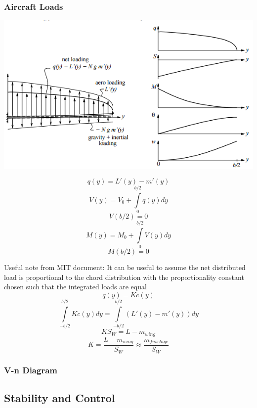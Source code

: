 \documentclass[12pt]{article}
\newcommand{\intlim}[2]{\int\limits_{#1}^{#2}}
\begin{document}
\subsubsection{Aircraft Loads}
\begin{minipage}{0.63\textwidth}
\includegraphics[width=\textwidth]{Graphics/aircraft_loads.png}
\end{minipage}
\begin{minipage}{0.35\textwidth}
$$q(y)=L'(y)-m'(y)$$
$$V(y) = V_0 + \intlim{0}{b/2}q(y)dy$$
$$V(b/2) = 0$$
$$M(y) = M_0 + \intlim{0}{b/2}V(y)dy$$
$$M(b/2) = 0 $$
\end{minipage}

Useful note from MIT document: It can be useful to assume the net distributed load is proportional to the chord distribution with the proportionality constant chosen such that the integrated loads are equal
$$q(y)=Kc(y)$$
$$\intlim{-b/2}{b/2}Kc(y)dy = \intlim{-b/2}{b/2}(L'(y)-m'(y))dy$$
$$KS_W = L-m_{wing}$$
$$K = \frac{L-m_{wing}}{S_W} \approx \frac{m_{fuselage}}{S_W}$$
\subsubsection{V-n Diagram}

\subsection{Stability and Control}
\end{document}
